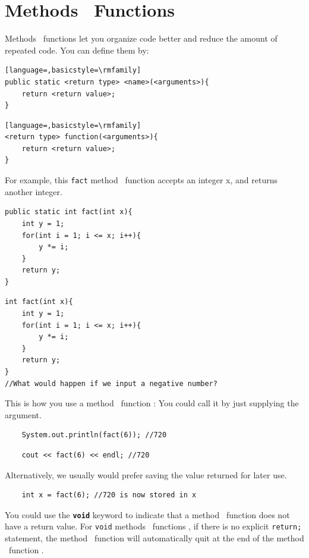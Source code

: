 \section{\if{} Methods \else ~Functions \fi}
\label{sec:functions}

\if{} Methods \else ~functions \fi let you organize code better and reduce the amount of repeated code. You can define them by:

\if{}
\begin{lstlisting}[language=,basicstyle=\rmfamily]
public static <return type> <name>(<arguments>){
    return <return value>;
}
\end{lstlisting}
\else
\begin{lstlisting}[language=,basicstyle=\rmfamily]
<return type> function(<arguments>){
    return <return value>;
}
\end{lstlisting}
\fi

For example, this \texttt{fact}\if{} method \else ~function \fi accepts an integer x, and returns another integer.
\if{}
\begin{lstlisting}
public static int fact(int x){
    int y = 1;
    for(int i = 1; i <= x; i++){
        y *= i;
    }
    return y;
}
\end{lstlisting}
\else
\begin{lstlisting}
int fact(int x){
    int y = 1;
    for(int i = 1; i <= x; i++){
        y *= i;
    }
    return y;
}
//What would happen if we input a negative number?
\end{lstlisting}
\fi

This is how you use a\if{} method \else ~function \fi: 
You could call it by just supplying the argument.

\if{}
\begin{lstlisting}
    System.out.println(fact(6)); //720
\end{lstlisting}
\else
\begin{lstlisting}
    cout << fact(6) << endl; //720
\end{lstlisting}
\fi

Alternatively, we usually would prefer saving the value returned for later use.

\begin{lstlisting}
    int x = fact(6); //720 is now stored in x
\end{lstlisting}

You could use the \texttt{\textbf{void}} keyword to indicate that a\if{} method \else ~function \fi does not have a return value. For \texttt{void}\if{} methods \else ~functions \fi, if there is no explicit \texttt{return;} statement, the\if{} method \else ~function \fi will automatically quit at the end of the\if{} method \else ~function \fi. 

